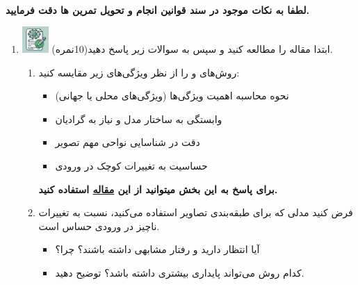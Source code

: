 \documentclass[12pt]{article}
\begin{document}
\fontsize{12pt}{14pt}\selectfont



\\
{\fontsize{14}{22}\selectfont \textbf{لطفا به نکات موجود در سند قوانین انجام و تحویل تمرین ها دقت فرمایید. }}

\begin{enumerate}

    \section*{سوالات تئوری}
    \item \includegraphics[width=1cm]{figs/Allowed_with_contributino.jpg}
     ابتدا مقاله \href{https://arxiv.org/pdf/2208.03608}{} را مطالعه کنید و سپس به سوالات زیر پاسخ دهید(10نمره).\\
     \begin{enumerate}
         \item روش‌های  و  را از نظر ویژگی‌های زیر مقایسه کنید:
         \begin{itemize}
             \item نحوه محاسبه اهمیت ویژگی‌ها (ویژگی‌های محلی یا جهانی)
             \item وابستگی به ساختار مدل و نیاز به گرادیان
             \item دقت در شناسایی نواحی مهم تصویر
             \item حساسیت به تغییرات کوچک در ورودی
         \end{itemize}
         \textbf{برای پاسخ به این بخش میتوانید از این \href{https://arxiv.org/pdf/2412.16003}{مقاله} استفاده کنید.}
         \vspace{1cm}
         \item فرض کنید مدلی که برای طبقه‌بندی تصاویر استفاده می‌کنید، نسبت به تغییرات ناچیز در ورودی حساس است.
         \begin{itemize}
             \item آیا انتظار دارید  و  رفتار مشابهی داشته باشند؟ چرا؟
             \item کدام روش می‌تواند پایداری بیشتری داشته باشد؟ توضیح دهید.
         \end{itemize}
     \end{enumerate}
     \vspace{1cm}


\end{enumerate}
\end{document}
